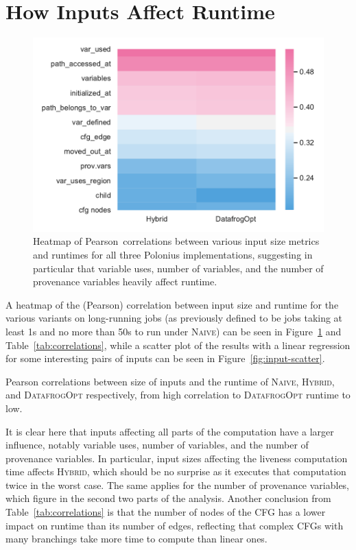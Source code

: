 \documentclass[11pt,a4paper,twoside,openany]{report}
\renewcommand\_{\textunderscore\allowbreak}
\begin{document}
\section{How Inputs Affect Runtime}\label{sec:inputs:correlation}
\begin{figure}
  \includegraphics[width=0.9\linewidth]{Graphs/corr_heatmap.pdf}
  \caption[Heatmap of Input Sizes Affecting Runtime]{Heatmap of
    Pearson~correlations between various input size metrics and runtimes for
    all three Polonius implementations, suggesting in particular that variable
    uses, number of variables, and the number of provenance variables heavily
    affect runtime.}\label{fig:corr-heatmap}
\end{figure}
A heatmap of the (Pearson) correlation between input size and runtime for the
various variants on long-running jobs (as previously defined to be jobs taking
at least 1s and no more than 50s to run under \textsc{Naive}) can be seen in
Figure~\ref{fig:corr-heatmap} and Table~\ref{tab:correlations}, while a scatter
plot of the results with a linear regression for some interesting pairs of
inputs can be seen in Figure~\ref{fig:input-scatter}.

\begin{table}[ht]
  
  \caption[Pearson Correlations Between Sizes of Inputs and Runtime]{Pearson
    correlations between size of inputs and the runtime of \textsc{Naive},
    \textsc{Hybrid}, and \textsc{DatafrogOpt} respectively, from high
    correlation to \textsc{DatafrogOpt} runtime to low.}\label{tab:correlations}
\end{table}%

It is clear here that inputs affecting all parts of the computation have a
larger influence, notably variable uses, number of variables, and the number of
provenance variables. In particular, input sizes affecting the liveness
computation time affects \textsc{Hybrid}, which should be no surprise as it
executes that computation twice in the worst case. The same applies for the
number of provenance variables, which figure in the second two parts of the
analysis. Another conclusion from Table~\ref{tab:correlations} is that the
number of nodes of the CFG has a lower impact on runtime than its number of
edges, reflecting that complex CFGs with many branchings take more time to
compute than linear ones.
\end{document}
